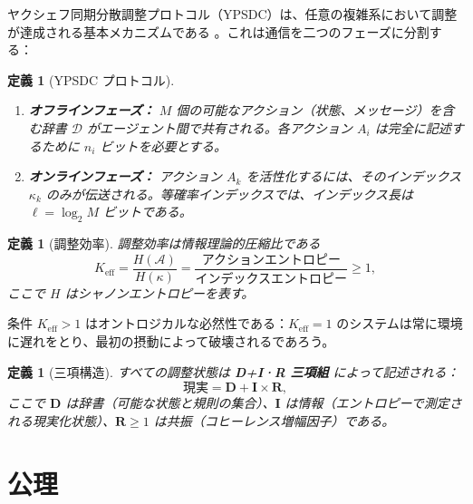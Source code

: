 \documentclass[12pt,a4paper]{article}
\newcommand{\Keff}{K_{\mathrm{eff}}}
\newtheorem{definition}[theorem]{定義}
\theoremstyle{remark}
\begin{document}
	ヤクシェフ同期分散調整プロトコル（YPSDC）は、任意の複雑系において調整が達成される基本メカニズムである \cite{Yakushev2026a, AppendixB}。これは通信を二つのフェーズに分割する：
	
	\begin{definition}[YPSDC プロトコル]
		\begin{enumerate}[label=(\roman*)]
			\item \textbf{オフラインフェーズ：} \(M\) 個の可能なアクション（状態、メッセージ）を含む辞書 \(\mathcal{D}\) がエージェント間で共有される。各アクション \(A_i\) は完全に記述するために \(n_i\) ビットを必要とする。
			\item \textbf{オンラインフェーズ：} アクション \(A_k\) を活性化するには、そのインデックス \(\kappa_k\) のみが伝送される。等確率インデックスでは、インデックス長は \(\ell = \log_2 M\) ビットである。
		\end{enumerate}
	\end{definition}
	
	\begin{definition}[調整効率]
		調整効率は情報理論的圧縮比である
		\begin{equation}
			\Keff = \frac{H(\mathcal{A})}{H(\kappa)} = \frac{\text{アクションエントロピー}}{\text{インデックスエントロピー}} \ge 1,
			\label{eq:keff}
		\end{equation}
		ここで \(H\) はシャノンエントロピーを表す。
	\end{definition}
	
	条件 \(K_{\mathrm{eff}} > 1\) はオントロジカルな必然性である：\(K_{\mathrm{eff}} = 1\) のシステムは常に環境に遅れをとり、最初の摂動によって破壊されるであろう。
	
	\begin{definition}[三項構造]
		すべての調整状態は \textbf{D+I·R 三項組} によって記述される：
		\[
		\text{現実} = \mathbf{D} + \mathbf{I} \times \mathbf{R},
		\]
		ここで \(\mathbf{D}\) は辞書（可能な状態と規則の集合）、\(\mathbf{I}\) は情報（エントロピーで測定される現実化状態）、\(\mathbf{R} \ge 1\) は共振（コヒーレンス増幅因子）である。
	\end{definition}
	
	\section{公理}
	\label{sec:axioms}
	
\end{document}

